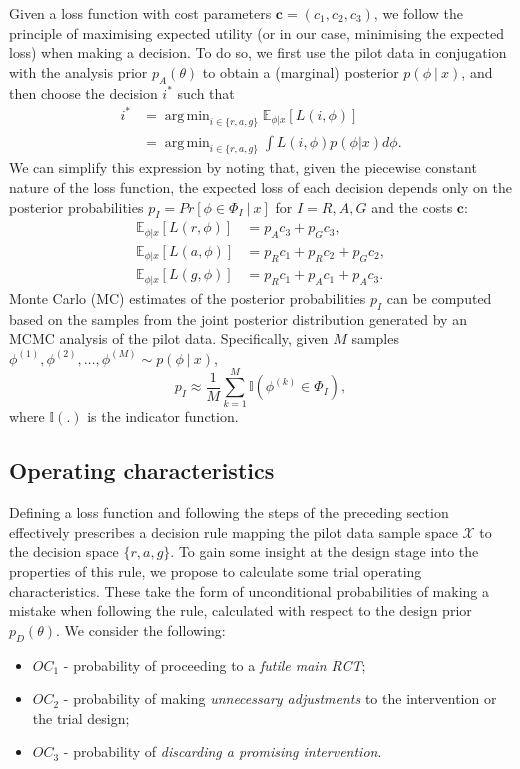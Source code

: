\documentclass{article} %
\DeclareMathOperator*{\argmin}{arg\,min}
\begin{document}
Given a loss function with cost parameters $\mathbf{c} = (c_1, c_2, c_3)$, we follow the principle of maximising expected utility (or in our case, minimising the expected loss) when making a decision. To do so, we first use the pilot data in conjugation with the analysis prior $p_{A}(\theta)$ to obtain a (marginal) posterior $p(\phi ~|~ x)$, and then choose the decision $i^{*}$ such that 
\begin{align}
i^{*} & = \argmin_{i \in \{r,a,g\}} \mathbb{E}_{\phi | x} [ L(i, \phi) ] \\
 & = \argmin_{i \in \{r,a,g\}} \int L(i, \phi) p(\phi | x) d\phi.
\end{align}
We can simplify this expression by noting that, given the piecewise constant nature of the loss function, the expected loss of each decision depends only on the posterior probabilities $p_{I} =  Pr[\phi \in \Phi_{I} ~|~ x]$ for $I = R, A, G$ and the costs $\mathbf{c}$:
\begin{align}\label{eqn:exp_loss}
\mathbb{E}_{\phi | x} [ L(r, \phi) ] & = p_{A}c_{3} + p_{G}c_{3}, \\
\mathbb{E}_{\phi | x} [ L(a, \phi) ] & = p_{R}c_{1} + p_{R}c_{2} + p_{G}c_{2}, \\
\mathbb{E}_{\phi | x} [ L(g, \phi) ] & = p_{R}c_{1} + p_{A}c_{1} + p_{A}c_{3}.
\end{align}
Monte Carlo (MC) estimates of the posterior probabilities $p_I$ can be computed based on the samples from the joint posterior distribution generated by an MCMC analysis of the pilot data. Specifically, given $M$ samples $\phi^{(1)}, \phi^{(2)}, \ldots , \phi^{(M)} \sim p(\phi ~|~ x)$, 
\begin{equation}
p_I \approx \frac{1}{M} \sum_{k = 1}^{M}  \mathbb{I}(\phi^{(k)} \in \Phi_I),
\end{equation}
where $\mathbb{I}(.)$ is the indicator function.

\subsection{Operating characteristics}\label{sec:evaluation}

Defining a loss function and following the steps of the preceding section effectively prescribes a decision rule mapping the pilot data sample space $\mathcal{X}$ to the decision space $\{r, a, g\}$. To gain some insight at the design stage into the properties of this rule, we propose to calculate some trial operating characteristics. These take the form of unconditional probabilities of making a mistake when following the rule, calculated with respect to the design prior $p_D(\theta)$. We consider the following:
\begin{itemize}
\item $OC_1$ - probability of proceeding to a \emph{futile main RCT};
\item $OC_2$ - probability of making \emph{unnecessary adjustments} to the intervention or the trial design;
\item $OC_3$ - probability of \emph{discarding a promising intervention}.
\end{itemize}
\end{document}

